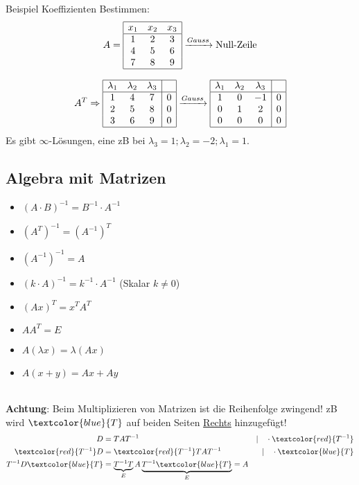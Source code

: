 \noindent Beispiel Koeffizienten Bestimmen:
\[
A = \begin{array}{|ccc|}
	\hline
	x_1 & x_2 & x_3 \\
	\hline
	1 & 2 & 3 \\
	4 & 5 & 6 \\
	7 & 8 & 9 \\
	\hline
\end{array} \xrightarrow{Gauss} \text{Null-Zeile}
\]

\[
A^T \Rightarrow
	\begin{array}{|ccc|c|}
		\hline
		\lambda_1 & \lambda_2 & \lambda_3 & \\
		\hline
		1 & 4 & 7 & 0 \\
		2 & 5 & 8 & 0 \\
		3 & 6 & 9 & 0 \\
		\hline
	\end{array}
	\xrightarrow{Gauss}
	\begin{array}{|ccc|c|}
		\hline
		\lambda_1 & \lambda_2 & \lambda_3 & \\
		\hline
		1 & 0 & -1 & 0 \\
		0 & 1 & 2 & 0 \\
		0 & 0 & 0 & 0 \\
		\hline
	\end{array}
\]
Es gibt $\infty$-Lösungen, eine zB bei $\lambda_3 = 1; \lambda_2 = -2; \lambda_1 = 1$.

\subsection{Algebra mit Matrizen}
\begin{itemize}[nosep]
	\item $(A \cdot B)^{-1} = B^{-1} \cdot A^{-1}$
	\item $(A^T)^{-1} = (A^{-1})^T$
	\item $(A^{-1})^{-1} = A$
	\item $(k \cdot A)^{-1} = k^{-1} \cdot A^{-1}$ (Skalar $k \neq 0$)
	\item $(Ax)^T = x^TA^T$
	\item $AA^T = E$
	\item $A(\lambda x) = \lambda(Ax)$
	\item $A(x + y) = Ax + Ay$
\end{itemize}
~\\
\noindent\textbf{Achtung}: Beim Multiplizieren von Matrizen ist die Reihenfolge zwingend! zB wird $\textcolor{blue}{T}$ auf beiden Seiten \underline{Rechts} hinzugefügt!
\begin{align*}
	D &= TAT^{-1}  &| \quad \cdot \textcolor{red}{T^{-1}}\\
	\textcolor{red}{T^{-1}}D &= \textcolor{red}{T^{-1}}TAT^{-1}  &| \quad \cdot \textcolor{blue}{T}\\
	T^{-1}D\textcolor{blue}{T} &= \underbrace{T^{-1}T}_{E} A \underbrace{T^{-1}\textcolor{blue}{T}}_{E} = A
\end{align*}
